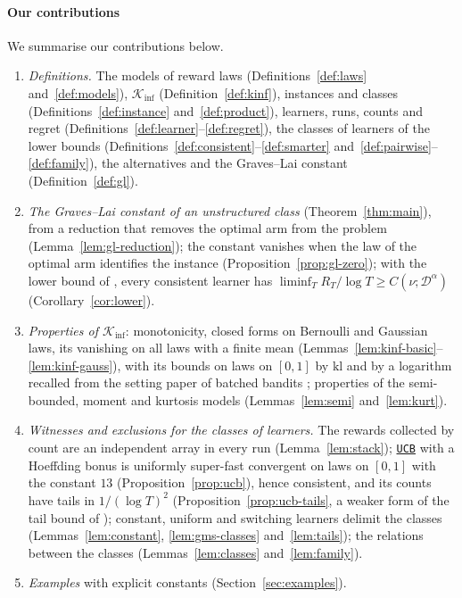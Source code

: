\documentclass[11pt]{article}
\newcommand{\ucb}{\hyperref[alg:ucb]{\texttt{UCB}}}
\begin{document}
\paragraph{Our contributions} We summarise our contributions below.
\begin{enumerate}[label=(\roman*),leftmargin=2.2em]
  \item \emph{Definitions.} The models of reward laws (Definitions~\ref{def:laws}
    and~\ref{def:models}), $\mathcal K_{\inf}$ (Definition~\ref{def:kinf}), instances and classes
    (Definitions~\ref{def:instance} and~\ref{def:product}), learners, runs, counts and regret
    (Definitions~\ref{def:learner}--\ref{def:regret}), the classes of learners of the lower bounds
    (Definitions~\ref{def:consistent}--\ref{def:smarter} and~\ref{def:pairwise}--\ref{def:family}),
    the alternatives and the Graves--Lai constant (Definition~\ref{def:gl}).
  \item \emph{The Graves--Lai constant of an unstructured class} (Theorem~\ref{thm:main}), from a
    reduction that removes the optimal arm from the problem (Lemma~\ref{lem:gl-reduction}); the
    constant vanishes when the law of the optimal arm identifies the instance
    (Proposition~\ref{prop:gl-zero}); with the lower bound of \citet[Theorem~1]{GMS19}, every
    consistent learner has $\liminf_T R_T/\log T\ge C(\nu;\mathcal D^\alpha)$ (Corollary~\ref{cor:lower}).
  \item \emph{Properties of $\mathcal K_{\inf}$}: monotonicity, closed forms on Bernoulli and
    Gaussian laws, its vanishing on all laws with a finite mean
    (Lemmas~\ref{lem:kinf-basic}--\ref{lem:kinf-gauss}), with its bounds on laws on $[0,1]$ by
    $\mathrm{kl}$ and by a logarithm recalled from the setting paper of batched bandits \citep[Proposition~4.2]{INC-P006};
    properties of the semi-bounded, moment and kurtosis models (Lemmas~\ref{lem:semi}
    and~\ref{lem:kurt}).
  \item \emph{Witnesses and exclusions for the classes of learners.} The rewards collected by
    count are an independent array in every run (Lemma~\ref{lem:stack}); \ucb{} with a Hoeffding
    bonus is uniformly super-fast convergent on laws on $[0,1]$ with the constant $13$
    (Proposition~\ref{prop:ucb}), hence consistent, and its counts have tails in $1/(\log T)^2$
    (Proposition~\ref{prop:ucb-tails}, a weaker form of the tail bound of
    \citet[Theorem~8]{AMS09}); constant, uniform and switching learners delimit the
    classes (Lemmas~\ref{lem:constant}, \ref{lem:gms-classes} and~\ref{lem:tails}); the relations
    between the classes (Lemmas~\ref{lem:classes} and~\ref{lem:family}).
  \item \emph{Examples} with explicit constants (Section~\ref{sec:examples}).
\end{enumerate}
\end{document}
